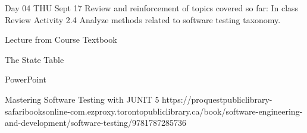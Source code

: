 Day 04 THU Sept 17
  Review and reinforcement of topics covered so far: In class Review Activity
  2.4 Analyze methods related to software testing taxonomy.
  
  Lecture from Course Textbook
  
  The State Table
  
  PowerPoint
  
  Mastering Software Testing with JUNIT 5
  https://proquestpubliclibrary-safaribooksonline-com.ezproxy.torontopubliclibrary.ca/book/software-engineering-and-development/software-testing/9781787285736